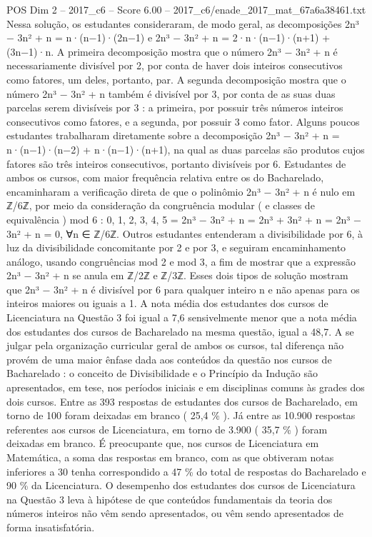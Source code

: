 \begin{textsample}{POS Dim 2 – 2017\_c6 – Score 6.00 – 2017\_c6/enade\_2017\_mat\_67a6a38461.txt}
Nessa solução, os estudantes consideraram, de modo geral, as decomposições 2n³ − 3n² + n = n·(n−1)·(2n−1) e 2n³ − 3n² + n = 2·n·(n−1)·(n+1) + (3n−1)·n.
A primeira decomposição mostra que o número 2n³ − 3n² + n é necessariamente divisível por 2, por conta de haver dois inteiros consecutivos como fatores, um deles, portanto, par.
A segunda decomposição mostra que o número 2n³ − 3n² + n também é divisível por 3, por conta de as suas duas parcelas serem divisíveis por 3 : a primeira, por possuir três números inteiros consecutivos como fatores, e a segunda, por possuir 3 como fator.
Alguns poucos estudantes trabalharam diretamente sobre a decomposição 2n³ − 3n² + n = n·(n−1)·(n−2) + n·(n−1)·(n+1), na qual as duas parcelas são produtos cujos fatores são três inteiros consecutivos, portanto divisíveis por 6.
Estudantes de ambos os cursos, com maior frequência relativa entre os do Bacharelado, encaminharam a verificação direta de que o polinômio 2n³ − 3n² + n é nulo em ℤ/6ℤ, por meio da consideração da congruência modular ( e classes de equivalência ) mod 6 : 0, 1, 2, 3, 4, 5 = 2n³ − 3n² + n = 2n³ + 3n² + n = 2n³ − 3n² + n = 0, ∀n ∈ ℤ/6ℤ.
Outros estudantes entenderam a divisibilidade por 6, à luz da divisibilidade concomitante por 2 e por 3, e seguiram encaminhamento análogo, usando congruências mod 2 e mod 3, a fim de mostrar que a expressão 2n³ − 3n² + n se anula em ℤ/2ℤ e ℤ/3ℤ.
Esses dois tipos de solução mostram que 2n³ − 3n² + n é divisível por 6 para qualquer inteiro n e não apenas para os inteiros maiores ou iguais a 1.
A nota média dos estudantes dos cursos de Licenciatura na Questão 3 foi igual a 7,6 sensivelmente menor que a nota média dos estudantes dos cursos de Bacharelado na mesma questão, igual a 48,7.
A se julgar pela organização curricular geral de ambos os cursos, tal diferença não provém de uma maior ênfase dada aos conteúdos da questão nos cursos de Bacharelado : o conceito de Divisibilidade e o Princípio da Indução são apresentados, em tese, nos períodos iniciais e em disciplinas comuns às grades dos dois cursos.
Entre as 393 respostas de estudantes dos cursos de Bacharelado, em torno de 100 foram deixadas em branco ( 25,4 \% ).
Já entre as 10.900 respostas referentes aos cursos de Licenciatura, em torno de 3.900 ( 35,7 \% ) foram deixadas em branco.
É preocupante que, nos cursos de Licenciatura em Matemática, a soma das respostas em branco, com as que obtiveram notas inferiores a 30 tenha correspondido a 47 \% do total de respostas do Bacharelado e 90 \% da Licenciatura.
O desempenho dos estudantes dos cursos de Licenciatura na Questão 3 leva à hipótese de que conteúdos fundamentais da teoria dos números inteiros não vêm sendo apresentados, ou vêm sendo apresentados de forma insatisfatória.

\end{textsample}
